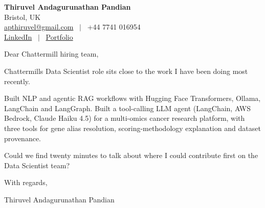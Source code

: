 \documentclass[11pt,a4paper]{article}
\begin{document}
\raggedright
\pagestyle{empty}

\begin{center}
    {\LARGE \color{linkblue} \textbf{Thiruvel Andagurunathan Pandian}}\\[0.2cm]
    Bristol, UK \\
    \href{mailto:apthiruvel@gmail.com}{apthiruvel@gmail.com} \ $|$ \ +44 7741 016954 \\
\href{https://www.linkedin.com/in/thiruvel-a-p/}{LinkedIn} \ $|$ \ \href{https://thiruvel-ap.github.io/PersonalPortfolio/}{Portfolio}
\end{center}

\vspace{0.4cm}

\noindent
Dear Chattermill hiring team,

Chattermill\textquotesingle{}s Data Scientist role sits close to the work I have been doing most recently.

Built NLP and agentic RAG workflows with Hugging Face Transformers, Ollama, LangChain and LangGraph. Built a tool-calling LLM agent (LangChain, AWS Bedrock, Claude Haiku 4.5) for a multi-omics cancer research platform, with three tools for gene alias resolution, scoring-methodology explanation and dataset provenance.

Could we find twenty minutes to talk about where I could contribute first on the Data Scientist team?

\vspace{0.5cm}

With regards,

Thiruvel Andagurunathan Pandian
\end{document}
